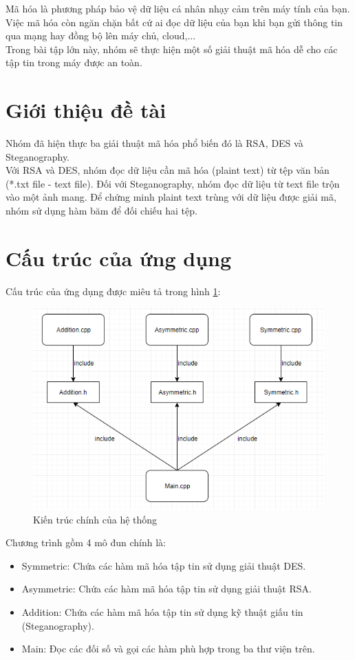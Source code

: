 \documentclass[a4paper]{article}
\begin{document}

\newpage
\tableofcontents
\newpage

Mã hóa là phương pháp bảo vệ dữ liệu cá nhân nhạy cảm trên máy tính của bạn. Việc mã hóa còn ngăn chặn bất cứ ai đọc dữ liệu của bạn khi bạn gửi thông tin qua mạng hay đồng bộ lên máy chủ, cloud,...\\

Trong bài tập lớn này, nhóm sẽ thực hiện một số giải thuật mã hóa dễ cho các tập tin trong máy được an toàn.

\section{Giới thiệu đề tài}
Nhóm đã hiện thực ba giải thuật mã hóa phổ biến đó là RSA, DES và Steganography.\\

Với RSA và DES, nhóm đọc dữ liệu cần mã hóa (plaint text) từ tệp văn bản (*.txt file - text file). Đối với Steganography, nhóm đọc dữ liệu từ text file trộn vào một ảnh mang.
Để chứng minh plaint text trùng với dữ liệu được giải mã, nhóm sử dụng hàm băm để đối chiếu hai tệp.

\section{Cấu trúc của ứng dụng}
Cấu trúc của ứng dụng được miêu tả trong hình \ref{fig:file_structure}:
\begin{figure}[htp]
    \centering
    \includegraphics[scale=1]{file_structure.png}
    \caption{Kiến trúc chính của hệ thống}
    \label{fig:file_structure}
\end{figure}
Chương trình gồm 4 mô đun chính là:
\begin{itemize}
    \item Symmetric: Chứa các hàm mã hóa tập tin sử dụng giải thuật DES.
    \item Asymmetric: Chứa các hàm mã hóa tập tin sử dụng giải thuật RSA.
    \item Addition: Chứa các hàm mã hóa tập tin sử dụng kỹ thuật giấu tin (Steganography).
    \item Main: Đọc các đối số và gọi các hàm phù hợp trong ba thư viện trên.
\end{itemize}
\end{document}
